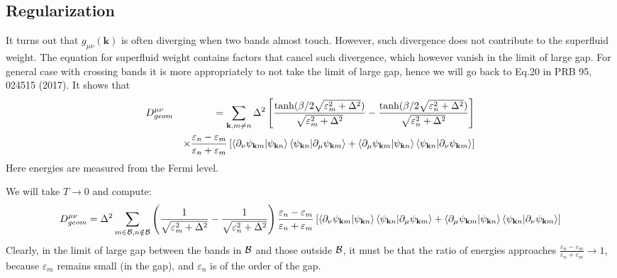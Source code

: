 \documentclass[onecolumn, prb,preprintnumbers,amsmath,amssymb,floatfix]{revtex4}
\newcommand{\vk}{{\mathbf{k}}}
\newcommand{\cb}{{\cal B}}
\begin{document}
\subsection{Regularization}

It turns out that $g_{\mu\nu}(\vk)$ is often diverging when two bands
almost touch. However, such divergence does not contribute to the
superfluid weight. The equation for superfluid weight contains factors
that cancel such divergence, which however vanish in the limit of
large gap. For general case with crossing bands it is more
appropriately to not take the limit of large gap, hence we will go
back to Eq.20 in PRB 95, 024515 (2017). It shows that
\begin{eqnarray}
  D^{\mu\nu}_{geom}  &&=\sum_{\vk,m\ne n}
  \Delta^2\left[\frac{\tanh(\beta/2
                        \sqrt{\varepsilon_m^2+\Delta^2})}{\sqrt{\varepsilon_m^2+\Delta^2}}-\frac{\tanh(\beta/2
                        \sqrt{\varepsilon_n^2+\Delta^2})}{\sqrt{\varepsilon_n^2+\Delta^2}}
  \right]
  \nonumber\\
  &&\times\frac{\varepsilon_n-\varepsilon_m}{\varepsilon_n+\varepsilon_m}
%
     \left[\braket{\partial_\nu\psi_{\vk m}|\psi_{\vk n}}\braket{\psi_{\vk n}|\partial_\mu \psi_{\vk m}}
   +\braket{\partial_\mu \psi_{\vk m}|\psi_{\vk n}}\braket{\psi_{\vk n}|\partial_\nu \psi_{\vk m}}\right]
\end{eqnarray}
Here energies are measured from the Fermi level.

We will take $T\rightarrow 0$ and compute:
\begin{eqnarray}
  D^{\mu\nu}_{geom} =\Delta^2
  \sum_{m\in\cb,n\notin\cb}
  \left( \frac{1}{\sqrt{\varepsilon_m^2+\Delta^2}}-
  \frac{1}{\sqrt{\varepsilon_n^2+\Delta^2}}
  \right)
  \frac{\varepsilon_n-\varepsilon_m}{\varepsilon_n+\varepsilon_m}
    \left[ \braket{\partial_\nu\psi_{\vk m}|\psi_{\vk n}}\braket{\psi_{\vk n}|\partial_\mu \psi_{\vk m}}
   +\braket{\partial_\mu \psi_{\vk m}|\psi_{\vk n}}\braket{\psi_{\vk n}|\partial_\nu \psi_{\vk m}}\right]
\end{eqnarray}  
Clearly, in the limit of large gap between the bands in $\cb$ and
those outside $\cb$, it must be that the ratio of energies approaches
$\frac{\varepsilon_n-\varepsilon_m}{\varepsilon_n+\varepsilon_m}\rightarrow
1$, because $\varepsilon_m$ remains small (in the gap), and $\varepsilon_n$
is of the order of the gap.
\end{document}

